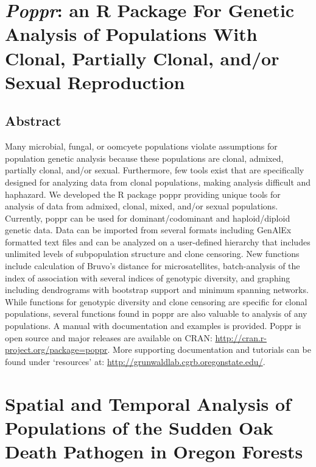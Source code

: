 \documentclass[double,12pt]{beavtex}
\begin{document}
  \chapter{\texorpdfstring{\emph{Poppr}: an R Package For Genetic Analysis
  of Populations With Clonal, Partially Clonal, and/or Sexual
  Reproduction}{Poppr: an R Package For Genetic Analysis of Populations With Clonal, Partially Clonal, and/or Sexual Reproduction}}\label{poppr-an-r-package-for-genetic-analysis-of-populations-with-clonal-partially-clonal-andor-sexual-reproduction}
  
  \section{Abstract}\label{abstract}
  
  Many microbial, fungal, or oomcyete populations violate assumptions for
  population genetic analysis because these populations are clonal,
  admixed, partially clonal, and/or sexual. Furthermore, few tools exist
  that are specifically designed for analyzing data from clonal
  populations, making analysis difficult and haphazard. We developed the R
  package poppr providing unique tools for analysis of data from admixed,
  clonal, mixed, and/or sexual populations. Currently, poppr can be used
  for dominant/codominant and haploid/diploid genetic data. Data can be
  imported from several formats including GenAlEx formatted text files and
  can be analyzed on a user-defined hierarchy that includes unlimited
  levels of subpopulation structure and clone censoring. New functions
  include calculation of Bruvo's distance for microsatellites,
  batch-analysis of the index of association with several indices of
  genotypic diversity, and graphing including dendrograms with bootstrap
  support and minimum spanning networks. While functions for genotypic
  diversity and clone censoring are specific for clonal populations,
  several functions found in poppr are also valuable to analysis of any
  populations. A manual with documentation and examples is provided. Poppr
  is open source and major releases are available on CRAN:
  \url{http://cran.r-project.org/package=poppr}. More supporting
  documentation and tutorials can be found under `resources' at:
  \url{http://grunwaldlab.cgrb.oregonstate.edu/}.
  
  \chapter{Spatial and Temporal Analysis of Populations of the Sudden Oak
  Death Pathogen in Oregon
  Forests}\label{spatial-and-temporal-analysis-of-populations-of-the-sudden-oak-death-pathogen-in-oregon-forests}
  
\end{document}
